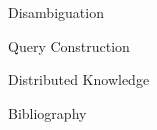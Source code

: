 \documentclass{beamer}
\begin{document}

\begin{frame}{Disambiguation}
\end{frame}
\begin{frame}{Query Construction}
\end{frame}
\begin{frame}{Distributed Knowledge}
\end{frame}

\begin{frame}{Bibliography}
  \printbibliography
\end{frame}
\end{document}
